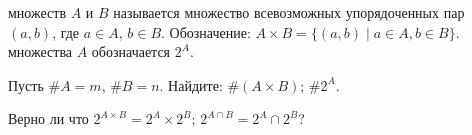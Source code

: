 \documentclass[a4paper,12pt]{article}
\begin{document}









 множеств $A$ и $B$ называется множество всевозможных упорядоченных пар $(a,b)$, где $a\in A$, $b \in B$. Обозначение: $A \times B = \{ (a,b) \mid a\in A, b\in B \}$.
 множества $A$ обозначается $2^A$.


 Пусть $\#A=m$, $\#B=n$. Найдите:
$\#(A\times B)$;
$\#2^A$.


Верно ли что
$2^{A\times B} = 2^A \times 2^B$;
$2^{A\cap B} = 2^A \cap 2^B$?




\vspace*{-4mm}
\end{document}
